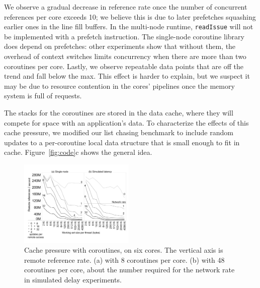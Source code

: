 \documentclass[10pt,nocopyrightspace]{sigplanconf}
\begin{document}
We observe a gradual decrease in reference rate once the number of
concurrent references per core exceeds 10; we believe this is due to
later prefetches squashing earlier ones in the line fill buffers. In the multi-node runtime, \texttt{readIssue} will not be implemented with a prefetch instruction. The single-node coroutine library does depend on prefetches: other experiments show that without them, the overhead of context switches limits concurrency when there are more than two coroutines per core. Lastly, we observe repeatable data points that are off the trend and fall below the max. This effect is harder to explain, but we suspect it may be
due to resource contention in the cores' pipelines once the memory
system is full of requests. 



The stacks for the coroutines are stored in the data cache, where they
will compete for space with an application's data. To characterize the
effects of this cache pressure, we modified our list chasing benchmark
to include random updates to a per-coroutine local data structure that
is small enough to fit in cache. Figure~\ref{fig:code}c shows the
general idea.

\begin{figure}[h]
  \begin{center}
    \includegraphics[width=0.49\textwidth]{figures/cachepressurenewview-edited.pdf}
  \end{center}
  \vspace{0.0in}
  \caption{Cache pressure with coroutines, on six cores. The vertical axis is remote reference rate. (a) with 8 coroutines per core. (b) with 48 coroutines per core, about the number required for the network rate in simulated delay experiments. }
  \label{fig:cache-pressure}
\end{figure}
\end{document}

